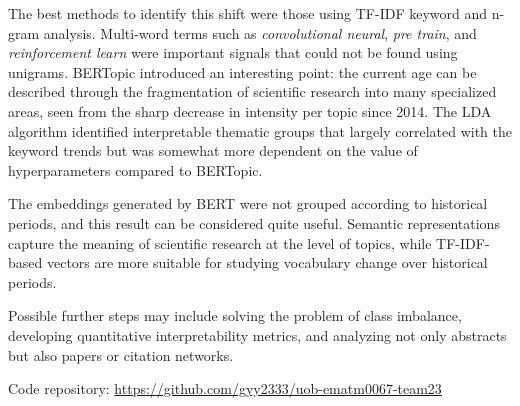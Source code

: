 \documentclass{article}
\begin{document}
The best methods to identify this shift were those using TF-IDF keyword and n-gram
analysis. Multi-word terms
such as \textit{convolutional neural}, \textit{pre train},
and \textit{reinforcement learn} were important signals that
could not be found using unigrams. BERTopic introduced an interesting point: the
current age can be described through the fragmentation of scientific research into
many specialized areas, seen from the sharp decrease in intensity per topic since
2014. The LDA algorithm identified interpretable thematic groups that largely
correlated with the keyword trends but was somewhat more dependent on the value of
hyperparameters compared to BERTopic.

The embeddings generated by BERT were not grouped according to historical periods,
and this result can be considered quite useful. Semantic representations capture the
meaning of scientific research at the level of topics, while TF-IDF-based vectors
are more suitable for studying vocabulary change over historical periods.

Possible further steps may include solving the problem of class imbalance,
developing quantitative interpretability metrics, and analyzing not only abstracts but
also papers or citation networks.

Code repository: \url{https://github.com/gyy2333/uob-ematm0067-team23}




\end{document}
